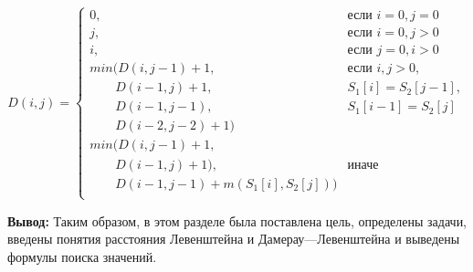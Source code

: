 \begin{equation}
	\label{equation:dam-lev}
	D(i, j) = \begin{cases}
		0, & \textrm{$\mbox{если }i = 0, j = 0$}\\
		j, & \textrm{$\mbox{если }i = 0, j > 0$}\\
		i, & \textrm{$\mbox{если }j = 0, i > 0$}\\
		min(D(i, j - 1) + 1, & \textrm{$\mbox{если }i, j > 0,$}\\
		\qquad D(i - 1, j) + 1, & \textrm{$S_{1}[i] = S_{2}[j - 1],$}\\
		\qquad D(i - 1, j -1), & \textrm{$S_{1}[i - 1] = S_{2}[j]$}\\
		\qquad D(i - 2, j - 2) + 1) \\
		min(D(i, j - 1) + 1, \\
		\qquad D(i - 1, j) + 1), & \textrm{$\mbox{иначе}$}\\
		\qquad D(i - 1, j - 1) + m(S_{1}[i], S_{2}[j])) \\
	\end{cases}
\end{equation}

\textbf{Вывод:}
Таким образом, в этом разделе была поставлена цель, определены задачи, введены понятия расстояния Левенштейна и Дамерау---Левенштейна и выведены формулы поиска значений.
